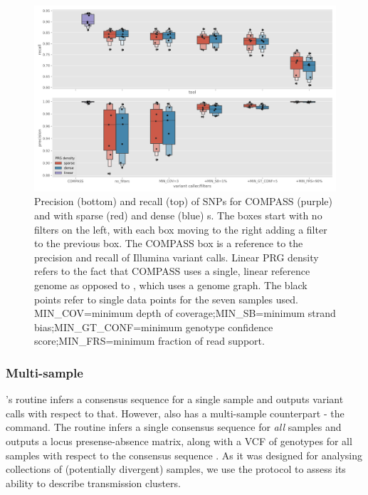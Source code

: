 \begin{figure}
\begin{center}
\includegraphics[width=0.90\columnwidth]{Chapter2/Figs/pandora-precision-recall-filters-snps.png}
\caption{{Precision (bottom) and recall (top) of SNPs for COMPASS (purple) and \pandora{} with sparse (red) and dense (blue) \prg{}s. The \pandora{} boxes start with no filters on the left, with each box moving to the right adding a filter to the previous box. The COMPASS box is a reference to the precision and recall of Illumina variant calls. Linear PRG density refers to the fact that COMPASS uses a single, linear reference genome as opposed to \pandora{}, which uses a genome graph. The black points refer to single data points for the seven samples used. MIN\_COV=minimum depth of coverage;MIN\_SB=minimum strand bias;MIN\_GT\_CONF=minimum genotype confidence score;MIN\_FRS=minimum fraction of read support.
{\label{fig:pandora-filters-snps}}%
}}
\end{center}
\end{figure}

\subsubsection{Multi-sample}

\pandora{}'s  routine infers a consensus sequence for a single sample and outputs variant calls with respect to that. However, \pandora{} also has a multi-sample counterpart - the  command. The  routine infers a single consensus sequence for \emph{all} samples and outputs a locus presense-absence matrix, along with a VCF of genotypes for all samples with respect to the consensus sequence . As it was designed for analysing collections of (potentially divergent) samples, we use the  protocol to assess its ability to describe transmission clusters. 

